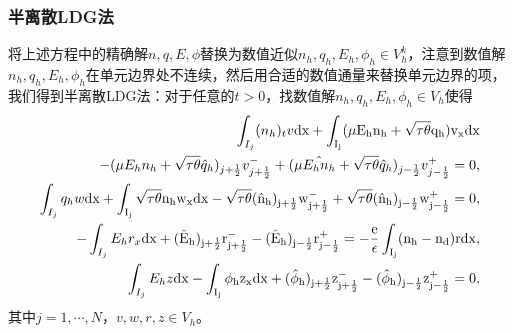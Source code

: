 \subsubsection{半离散LDG法}
将上述方程中的精确解$n,q,E,\phi$替换为数值近似$n_h,q_h,E_h,\phi_h \in V_h^k$，注意到数值解$n_h,q_h,E_h,\phi_h$在单元边界处不连续，然后用合适的数值通量来替换单元边界的项，我们得到半离散LDG法：对于任意的$t>0$，找数值解$n_h,q_h,E_h,\phi_h \in V_h$使得
\begin{align}
    \int_{I_j} (n_h)_t v \rm{d}x + \int_{I_j}(\mu E_h n_h + \sqrt{\tau \theta}q_h)v_x\rm{d} x                                                               \nonumber                                                                 \\
    - (\mu E_hn_h + \sqrt{\tau \theta}\hat{q}_h)_{j+\frac{1}{2}}v_{j+\frac{1}{2}}^- +(\mu \hat{E_hn_h} + \sqrt{\tau \theta}\hat{q}_h)_{j-\frac{1}{2}}v_{j-\frac{1}{2}}^+ = 0,                                   \label{LDG:1}         \\
    \int_{I_j} q_hw \rm{d}x + \int_{I_j}\sqrt{\tau \theta} n_h w_x \rm{d}x - \sqrt{\tau \theta} (\hat{n}_h)_{j+\frac{1}{2}}w_{j+\frac{1}{2}}^- + \sqrt{\tau \theta} (\hat{n}_h)_{j-\frac{1}{2}}w_{j-\frac{1}{2}}^+ = 0, \label{LDG:2} \\
    -\int_{I_j}E_hr_x\rm{d}x + (\hat{E}_h)_{j+\frac{1}{2}}r_{j+\frac{1}{2}}^- - (\hat{E}_h)_{j-\frac{1}{2}}r_{j-\frac{1}{2}}^+ = -\frac{e}{\epsilon}\int_{I_j}(n_h-n_d)r\rm{d}x,                                        \label{LDG:3} \\
    \int_{I_j} E_hz \rm{d}x - \int_{I_j}\phi_h z_x \rm{d}x + (\hat{\phi}_h)_{j+\frac{1}{2}}z_{j+\frac{1}{2}}^- - (\hat{\phi}_h)_{j-\frac{1}{2}}z_{j-\frac{1}{2}}^+ = 0,\label{LDG:4}
\end{align}
其中$ j=1,\cdots,N$，$v,w,r,z \in V_h$。

